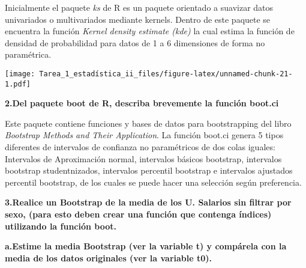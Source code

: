 \documentclass[
]{article}
\newenvironment{Shaded}{\begin{snugshade}}{\end{snugshade}}
\newcommand{\AttributeTok}[1]{\textcolor[rgb]{0.13,0.29,0.53}{#1}}
\newcommand{\ControlFlowTok}[1]{\textcolor[rgb]{0.13,0.29,0.53}{\textbf{#1}}}
\newcommand{\DecValTok}[1]{\textcolor[rgb]{0.00,0.00,0.81}{#1}}
\newcommand{\FunctionTok}[1]{\textcolor[rgb]{0.13,0.29,0.53}{\textbf{#1}}}
\newcommand{\NormalTok}[1]{#1}
\newcommand{\OtherTok}[1]{\textcolor[rgb]{0.56,0.35,0.01}{#1}}
\newcommand{\SpecialCharTok}[1]{\textcolor[rgb]{0.81,0.36,0.00}{\textbf{#1}}}
\newcommand{\StringTok}[1]{\textcolor[rgb]{0.31,0.60,0.02}{#1}}
\begin{document}
Inicialmente el paquete \emph{ks} de R es un paquete orientado a
suavizar datos univariados o multivariados mediante kernels. Dentro de
este paquete se encuentra la función \emph{Kernel density estimate
(kde)} la cual estima la función de densidad de probabilidad para datos
de 1 a 6 dimensiones de forma no paramétrica.

\begin{Shaded}
\end{Shaded}

\texttt{[image: Tarea\_1\_estadística\_ii\_files/figure-latex/unnamed-chunk-21-1.pdf]}

\textbf{2.Del paquete boot de R, describa brevemente la función boot.ci}

Este paquete contiene funciones y bases de datos para bootstrapping del
libro \emph{Bootstrap Methods and Their Application}. La función boot.ci
genera 5 tipos diferentes de intervalos de confianza no paramétricos de
dos colas iguales: Intervalos de Aproximación normal, intervalos básicos
bootstrap, intervalos bootstrap studentnizados, intervalos percentil
bootstrap e intervalos ajustados percentil bootstrap, de los cuales se
puede hacer una selección según preferencia.

\begin{Shaded}
\end{Shaded}

\textbf{3.Realice un Bootstrap de la media de los U. Salarios sin
filtrar por sexo, (para esto deben crear una función que contenga
índices) utilizando la función boot.}

\textbf{a.Estime la media Bootstrap (ver la variable t) y compárela con
la media de los datos originales (ver la variable t0).}
\end{document}
